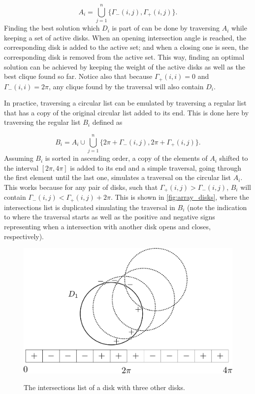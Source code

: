 \begin{equation}
A_i = \bigcup_{j=1}^n \{ \Gamma_-(i,j), \Gamma_+(i,j) \}.
\end{equation}
Finding the best solution which $D_i$ is part of can be done by traversing $A_i$ while keeping a set of active disks. When an opening intersection angle is reached, the corresponding disk is added to the active set; and when a closing one is seen, the corresponding disk is removed from the active set. This way, finding an optimal solution can be achieved by keeping the weight of the active disks as well as the best clique found so far. Notice also that because $\Gamma_+(i,i)=0$ and $\Gamma_-(i,i)=2\pi$, any clique found by the traversal will also contain $D_i$.

In practice, traversing a circular list can be emulated by traversing a regular list that has a copy of the original circular list added to its end. This is done here by traversing the regular list $B_i$ defined as

\begin{equation}\label{eq:b_i}
B_i = A_i\cup\bigcup_{j=1}^n \{ 2\pi+\Gamma_-(i,j), 2\pi+\Gamma_+(i,j) \}.
\end{equation}
Assuming $B_i$ is sorted in ascending order, a copy of the elements of $A_i$ shifted to the interval $[2\pi, 4\pi]$ is added to its end and a simple traversal, going through the first element until the last one, simulates a traversal on the circular list $A_i$.
This works because for any pair of disks, such that $\Gamma_+(i,j) > \Gamma_-(i,j)$, $B_i$ will contain $\Gamma_-(i,j) < \Gamma_+(i,j) + 2\pi$. This is shown in \autoref{fig:array_disks}, where the intersections list is duplicated simulating the traversal in $B_i$ (note the indication to where the traversal starts as well as the positive and negative signs representing when a intersection with another disk opens and closes, respectively).

\begin{figure}
    \centering
    
    \caption{The intersections list of a disk with three other disks.}
    \includegraphics[scale=.28]{tex/figures/3_disks_intersect2.pdf}
    \fautor
    \label{fig:array_disks}
\end{figure}

